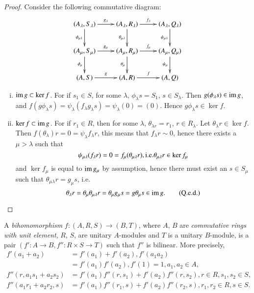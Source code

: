\begin{proof}%
Consider the following commutative diagram:
\[
\xymatrix{
(A_{\lambda}, S_{\lambda})
  \ar[r]^{g_{\lambda}}\ar[d]_{\phi_{\mu\lambda}} & (A_{\lambda},
  R_{\lambda}) \ar[r]^{f_{\lambda}} \ar[d]_{\theta_{\mu\lambda}} &
  (A_{\lambda}, Q_{\lambda})\ar[d]_{\psi_{\mu\lambda}}\\
(A_{\mu}, S_{\mu})\ar[r]^{g_{\mu}} \ar[d]_{\phi_{\mu}} & (A_{\mu},
  R_{\mu}) \ar[r]^{f_{\mu}} \ar[d]_{\theta_{\mu}} & (A_{\mu},
  Q_{\mu})\ar[d]_{\psi_{\mu}} \\
(A,S)\ar[r]^g & (A,R)\ar[r]^f & (A,Q)
}
\]
\begin{enumerate}[(i)]
\item \textit{$\operatorname{im}  g \subset \ker f$}. For if $s_1 \in S$, for some
  $\lambda$, $\phi_\lambda s = S_1$, $s \in S_\lambda$. Then
  $g(\phi_\lambda  s) \in \operatorname{im}  g$, and $f(g  \phi_\lambda  s) =
  \psi_\lambda (f_\lambda g_\lambda  s) = \psi_\lambda (0) =
  (0)$. Hence $g \phi_\lambda  s \in \ker f$. 

\item \textit{$\ker f \subset \operatorname{im}  g$.} For if $r_1 \in R$, then for
  some $\lambda$, $\theta_{\lambda r} = r_1$, $r \in R_\lambda$. Let
  $\theta_\lambda r \in \ker f$. Then $f(\theta_\lambda )r  = 0 =
  \psi_\lambda f_\lambda r$, this means that $f_\lambda r \sim 0$,
  hence there exists a $\mu > \lambda$ such that  
$$
\psi_{\mu\lambda} (f_\lambda  r) = 0 = f_\mu (\theta_{\mu\lambda} 
r), {\rm i.e.} \theta_{\mu\lambda} r \in \ker f_\mu  
$$
and $\ker f_\mu$ is equal to $\operatorname{im}  g_\mu$ by assumption, hence there
must exist an $s \in S_\mu$ such that $\theta_{\mu\lambda} r = g_\mu
 s$, i.e. 
\begin{equation*}
\theta_\lambda r = \theta_\mu \theta_{\mu\lambda} r = \theta_\mu
g_\mu  s = g  \theta_\mu s \in  \operatorname{im}  g. \tag{Q.e.d.} 
\end{equation*}
\end{enumerate}
\end{proof}

\begin{defi*}
A {\em{bihomomorphism}} $f : (A,R,S) \rightarrow (B,T)$, where $A$, $B$
are {\em{commutative rings with unit element}}, $R$, $S$, are unitary
$A$-modules and $T$ is a unitary $B$-module, is a pair $(f' : A 
\rightarrow B, f'' : R \times S \rightarrow T)$ such that $f''$ is
bilinear. More precisely, 
\begin{align*}
 f' (a_1 + a_2) & = f' (a_1) + f'(a_2), f' (a_1 a_2)\\
&  = f'(a_1) f'(a_2),
  f'(1) = 1, a_1, a_2 \in A,\\ 
 f'' (r,a_1 s_1 + a_2 s_2) & = f'(a_1)f''(r,s_1) + f'(a_2) f''(r,s_2), r
  \in R, s_1, s_2 \in S,\\  
 f'' (a_1 r_1 + a_2 r_2, s) & = f'(a_1) f''(r_1,s) + f'(a_2) f''(r_2,s),
  r_1,r_2 \in R, s \in S. 
\end{align*}\pageoriginale
\end{defi*}

